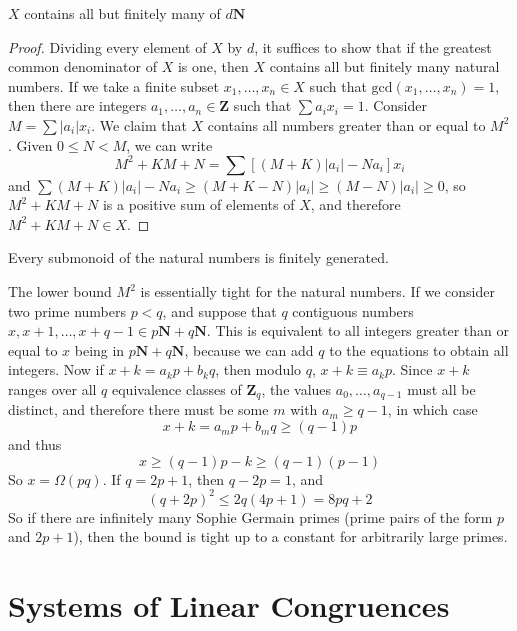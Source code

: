 \begin{theorem}
    $X$ contains all but finitely many of $d \mathbf{N}$
\end{theorem}
\begin{proof}
    Dividing every element of $X$ by $d$, it suffices to show that if the greatest common denominator of $X$ is one, then $X$ contains all but finitely many natural numbers. If we take a finite subset $x_1, \dots, x_n \in X$ such that $\text{gcd}(x_1, \dots, x_n) = 1$, then there are integers $a_1, \dots, a_n \in \mathbf{Z}$ such that $\sum a_ix_i = 1$. Consider $M = \sum |a_i|x_i$. We claim that $X$ contains all numbers greater than or equal to $M^2$. Given $0 \leq N < M$, we can write
    \[ M^2 + KM + N = \sum \left[ (M+K)|a_i| - Na_i \right] x_i \]
    and $\sum (M+K)|a_i| - Na_i \geq (M+K-N)|a_i| \geq (M-N)|a_i| \geq 0$, so $M^2 + KM + N$ is a positive sum of elements of $X$, and therefore $M^2 + KM + N \in X$.
\end{proof}

\begin{corollary}
    Every submonoid of the natural numbers is finitely generated.
\end{corollary}

\begin{example}
    The lower bound $M^2$ is essentially tight for the natural numbers. If we consider two prime numbers $p < q$, and suppose that $q$ contiguous numbers $x, x+1, \dots, x+q-1 \in p\mathbf{N} + q\mathbf{N}$. This is equivalent to all integers greater than or equal to $x$ being in $p\mathbf{N} + q\mathbf{N}$, because we can add $q$ to the equations to obtain all integers. Now if $x+k= a_kp + b_kq$, then modulo $q$, $x+k \equiv a_kp$. Since $x+k$ ranges over all $q$ equivalence classes of $\mathbf{Z}_q$, the values $a_0, \dots, a_{q-1}$ must all be distinct, and therefore there must be some $m$ with $a_m \geq q-1$, in which case
    \[ x + k = a_mp + b_mq \geq (q-1)p \]
    and thus
    \[ x \geq (q-1)p - k \geq (q-1)(p-1) \]
    So $x = \Omega(pq)$. If $q = 2p + 1$, then $q - 2p = 1$, and
    \[ (q+2p)^2 \leq 2q(4p+1) = 8pq + 2 \]
    So if there are infinitely many Sophie Germain primes (prime pairs of the form $p$ and $2p+1$), then the bound is tight up to a constant for arbitrarily large primes.
\end{example}

\section{Systems of Linear Congruences}

